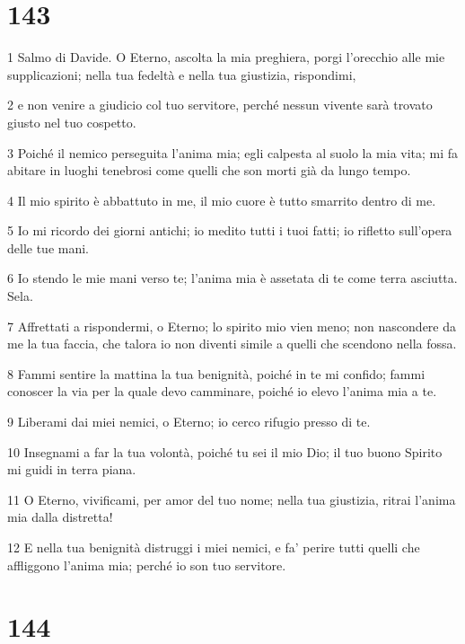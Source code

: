 \chapter{143}

\par 1 Salmo di Davide. O Eterno, ascolta la mia preghiera, porgi l'orecchio alle mie supplicazioni; nella tua fedeltà e nella tua giustizia, rispondimi,
\par 2 e non venire a giudicio col tuo servitore, perché nessun vivente sarà trovato giusto nel tuo cospetto.
\par 3 Poiché il nemico perseguita l'anima mia; egli calpesta al suolo la mia vita; mi fa abitare in luoghi tenebrosi come quelli che son morti già da lungo tempo.
\par 4 Il mio spirito è abbattuto in me, il mio cuore è tutto smarrito dentro di me.
\par 5 Io mi ricordo dei giorni antichi; io medito tutti i tuoi fatti; io rifletto sull'opera delle tue mani.
\par 6 Io stendo le mie mani verso te; l'anima mia è assetata di te come terra asciutta. Sela.
\par 7 Affrettati a rispondermi, o Eterno; lo spirito mio vien meno; non nascondere da me la tua faccia, che talora io non diventi simile a quelli che scendono nella fossa.
\par 8 Fammi sentire la mattina la tua benignità, poiché in te mi confido; fammi conoscer la via per la quale devo camminare, poiché io elevo l'anima mia a te.
\par 9 Liberami dai miei nemici, o Eterno; io cerco rifugio presso di te.
\par 10 Insegnami a far la tua volontà, poiché tu sei il mio Dio; il tuo buono Spirito mi guidi in terra piana.
\par 11 O Eterno, vivificami, per amor del tuo nome; nella tua giustizia, ritrai l'anima mia dalla distretta!
\par 12 E nella tua benignità distruggi i miei nemici, e fa' perire tutti quelli che affliggono l'anima mia; perché io son tuo servitore.

\chapter{144}

